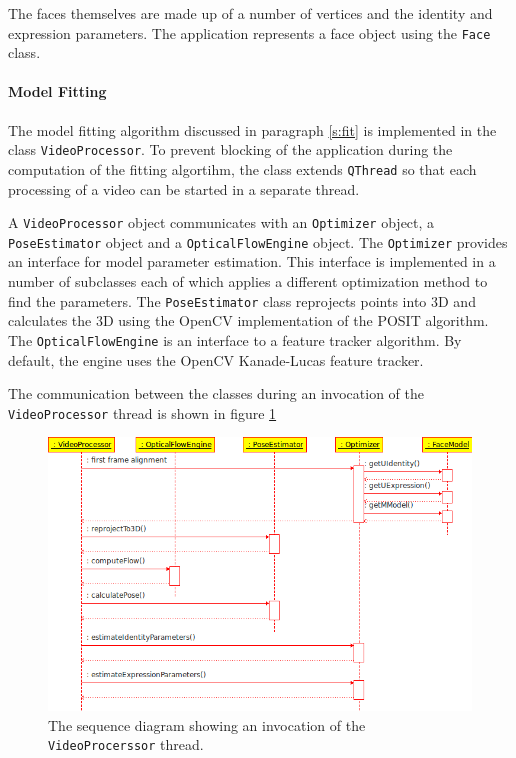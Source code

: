 \documentclass[11pt,a4paper]{report}
\begin{document}
The faces themselves are made up of a number of vertices and the identity and
expression parameters. The application represents a face object using the
\texttt{Face} class.
\paragraph{Model Fitting}
The model fitting algorithm discussed in paragraph \ref{s:fit} is implemented in
the class \texttt{VideoProcessor}. To prevent blocking of the application during the
computation of the fitting algortihm, the class extends \texttt{QThread} so that
each processing of a video can be started in a separate thread.

A \texttt{VideoProcessor} object communicates with an \texttt{Optimizer} object,
a \texttt{PoseEstimator} object and a \texttt{OpticalFlowEngine} object. The
\texttt{Optimizer} provides an interface for model parameter estimation. This
interface is implemented in a number of subclasses each of which applies a
different optimization method to find the parameters. The \texttt{PoseEstimator}
class reprojects points into 3D and calculates the 3D using the OpenCV
implementation of the POSIT algorithm. The \texttt{OpticalFlowEngine} is an
interface to a feature tracker algorithm. By default, the engine uses the OpenCV
Kanade-Lucas feature tracker.

The communication between the classes during an invocation of the
\texttt{VideoProcessor} thread is shown in figure \ref{fg:videoproc}

\begin{figure}[H]
\begin{centering}
\includegraphics[scale=0.71]{images/videoproc.png}
\par\end{centering}

\caption{The sequence diagram showing an invocation of the
  \texttt{VideoProcerssor} thread.}
\label{fg:videoproc}
\end{figure}
\end{document}
